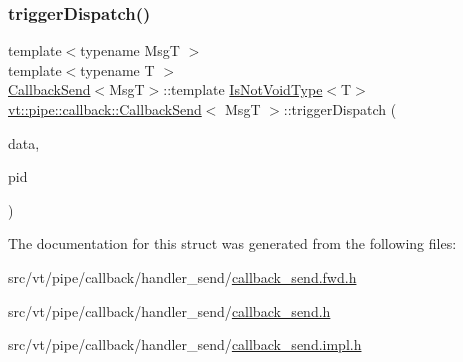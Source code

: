 \subsubsection{\texorpdfstring{trigger\+Dispatch()}{triggerDispatch()}\hspace{0.1cm}{\footnotesize\ttfamily [2/2]}}
{\footnotesize\ttfamily template$<$typename MsgT $>$ \\
template$<$typename T $>$ \\
\hyperlink{structvt_1_1pipe_1_1callback_1_1_callback_send}{Callback\+Send}$<$MsgT$>$\+::template \hyperlink{structvt_1_1pipe_1_1callback_1_1_callback_send_adb85e64e67e00aa71a9c173565dfb7dc}{Is\+Not\+Void\+Type}$<$T$>$ \hyperlink{structvt_1_1pipe_1_1callback_1_1_callback_send}{vt\+::pipe\+::callback\+::\+Callback\+Send}$<$ MsgT $>$\+::trigger\+Dispatch (\begin{DoxyParamCaption}\item[{\hyperlink{structvt_1_1pipe_1_1callback_1_1_callback_send_a5b21820f25b28f980921b1fe24d8a2dc}{Signal\+Data\+Type} $\ast$}]{data,  }\item[{\hyperlink{namespacevt_ac9852acda74d1896f48f406cd72c7bd3}{Pipe\+Type} const \&}]{pid }\end{DoxyParamCaption})}



The documentation for this struct was generated from the following files\+:\begin{DoxyCompactItemize}
\item 
src/vt/pipe/callback/handler\+\_\+send/\hyperlink{callback__send_8fwd_8h}{callback\+\_\+send.\+fwd.\+h}\item 
src/vt/pipe/callback/handler\+\_\+send/\hyperlink{callback__send_8h}{callback\+\_\+send.\+h}\item 
src/vt/pipe/callback/handler\+\_\+send/\hyperlink{callback__send_8impl_8h}{callback\+\_\+send.\+impl.\+h}\end{DoxyCompactItemize}
